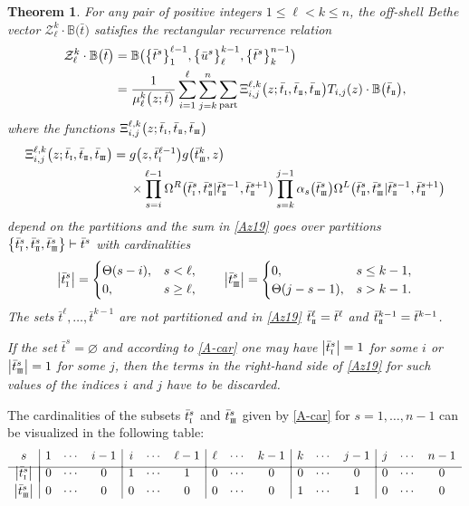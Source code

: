 \documentclass[pdftex]{sigma}
\newcommand{\so}{\scriptscriptstyle \rm I}
\newcommand{\st}{\scriptscriptstyle \rm I\hspace{-1pt}I}
\newcommand{\sth}{\scriptscriptstyle \rm I\hspace{-1pt}I\hspace{-1pt}I}
\newcommand{\bu}{\bar u}
\newcommand{\bt}{{\bar t}}
\newtheorem{thm}{Theorem}[section]
\theoremstyle{definition}
\def\BB{{\mathbb{B}}}
\def\r#1{\eqref{#1}}
\def\Z{\mathcal{Z}}
\def\Oml{\Omega^L}
\def\Omr{\Omega^R}
\begin{document}
\begin{thm}\label{rec-pr}
For any pair of positive integers $1\leq \ell< k\leq n$, the off-shell
Bethe vector
$\Z_\ell^{k}\cdot \BB\bigl(\bt\bigr)$ satisfies the
{\it rectangular} recurrence relation
\begin{align}
\Z_\ell^{k}\cdot \BB\bigl(\bt\bigr)&=
\BB\bigl(\bigl\{\bt^s\bigr\}_1^{\ell-1},\bigl\{\bu^{s}\bigr\}_\ell^{k-1},\bigl\{\bt^s\bigr\}_k^{n-1}\bigr)\nonumber\\
&=\frac{1}{\mu^k_\ell\bigl(z;\bt\bigr)}
\sum_{i=1}^\ell\sum_{j=k}^n \sum_{\rm part}
 \Xi^{\ell,k}_{i,j}\bigl(z;\bt_{\so},\bt_{\st},\bt_{\sth}\bigr)
T_{i,j}(z)\cdot\BB\bigl(\bt_{\st}\bigr) ,\label{Az19}
\end{align}
where the functions $\Xi^{\ell,k}_{i,j}\bigl(z;\bt_{\so},\bt_{\st},\bt_{\sth}\bigr)$
\begin{align}
\Xi^{\ell,k}_{i,j}\bigl(z;\bt_{\so},\bt_{\st},\bt_{\sth}\bigr)={}&
g\bigl(z, \bt^{\ell-1}_{\so}\bigr) g\bigl(\bt^k_{\sth}, z\bigr)\nonumber\\
&\times
\prod_{s=i}^{\ell-1}\Omr\bigl(\bt^s_{\so},\bt^s_{\st}|\bt^{s-1}_{\st},\bt^{s+1}_{\st}\bigr)
\prod_{s=k}^{j-1}\alpha_s\bigl(\bt^s_{\sth}\bigr)
\Oml\bigl(\bt^s_{\st},\bt^s_{\sth}|\bt^{s-1}_{\st},\bt^{s+1}_{\st}\bigr)\label{A-X-f}
\end{align}
depend on the partitions and
the sum in \r{Az19} goes over partitions
$ \bigl\{\bt^s_{\so},\bt^s_{\st},
\bt^s_{\sth}\bigr\}\vdash \bt^s$
with cardinalities
\begin{equation}\label{A-car}
\big|\bt^s_{\so}\big|=\begin{cases}\Theta(s-i),&s<\ell,\\0,&s\geq \ell,\end{cases}
\qquad
\big|\bt^s_{\sth}\big|=\begin{cases}0,&s\leq k-1,\\
\Theta(j-s-1), &s>k-1.\end{cases}
\end{equation}
 The sets $\bt^\ell,\dots,\bt^{k-1}$ are not partitioned
and in \r{Az19} $\bt^\ell_{\st}=\bt^\ell$ and $\bt^{k-1}_{\st}=\bt^{k-1}$.

If the set $\bt^s = \varnothing$ and according to
\r{A-car} one may have $\big|\bt^s_{\so}\big| = 1$ for some $i$ or
$\big|\bt^s_{\sth}\big| = 1$ for some $j$,
then the terms in the right-hand side
of \r{Az19} for such values of the indices $i$ and $j$ have to be discarded.
\end{thm}

The cardinalities of the subsets $\bt^s_{\so}$ and $\bt^s_{\sth}$ given by
\r{A-car} for $s=1,\dots,n-1$ can be visualized in the following table:
\begin{equation*}
\begin{array}{c|ccc|ccc|ccc|ccc|ccc}
s&1&\cdots&i-1&i&\cdots&\ell-1&\ell&\cdots&k-1&k&\cdots&j-1&j&\cdots&n-1\\[1mm]
\hline\\[-4.6mm]
\big|\bt^s_{\so}\big|&0&\cdots&0&1&\cdots&1&0&\cdots&0&0&\cdots&0&0&\cdots&0\\[1mm]
\big|\bt^s_{\sth}\big|&0&\cdots&0&0&\cdots&0&0&\cdots&0&1&\cdots&1&0&\cdots&0
\end{array}
\end{equation*}
\end{document}
